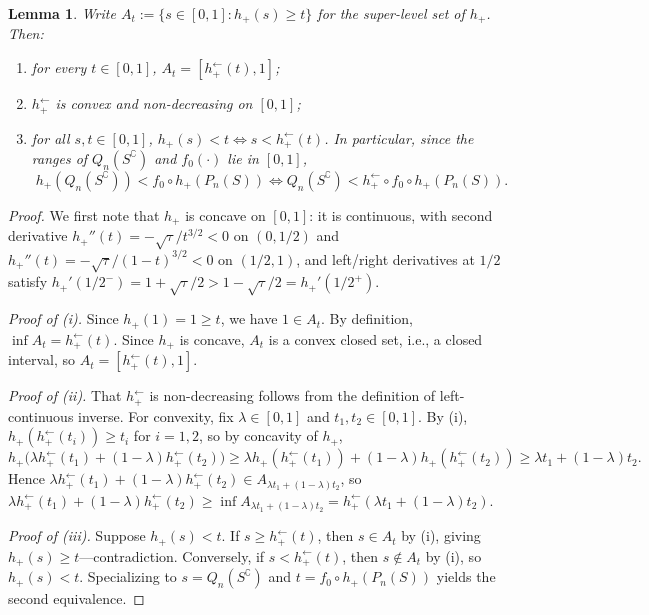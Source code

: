 \documentclass[english]{article}
\theoremstyle{plain}
\newtheorem{lemma}{Lemma}[section]
\theoremstyle{definition}
\newcommand{\hinv}{h_+^{\leftarrow}}
\newcommand{\fnull}{f_0}
\begin{document}
\begin{lemma}\label{lem:hinv-properties}
Write $A_t:=\{s\in[0,1]:h_+(s)\geqslant t\}$ for the super-level set of $h_+$. Then:
\begin{enumerate}[label=(\roman*)]
    \item for every $t\in[0,1]$, $A_t=[\hinv(t),1]$;
    \item $\hinv$ is convex and non-decreasing on $[0,1]$;
    \item for all $s,t\in[0,1]$, $h_+(s)<t\iff s<\hinv(t)$. In particular, since the ranges of $Q_n(S^\complement)$ and $\fnull(\cdot)$ lie in $[0,1]$,
    \[
        h_+(Q_n(S^\complement))<\fnull\circ h_+(P_n(S))\iff Q_n(S^\complement)<\hinv\circ\fnull\circ h_+(P_n(S)).
    \]
\end{enumerate}
\end{lemma}

\begin{proof}
We first note that $h_+$ is concave on $[0,1]$: it is continuous, with second derivative $h_+''(t)=-\sqrt{\tau}/t^{3/2}<0$ on $(0,1/2)$ and $h_+''(t)=-\sqrt{\tau}/(1-t)^{3/2}<0$ on $(1/2,1)$, and left/right derivatives at $1/2$ satisfy $h_+'(1/2^-)=1+\sqrt{\tau}/2>1-\sqrt{\tau}/2=h_+'(1/2^+)$.

\emph{Proof of (i).} Since $h_+(1)=1\geqslant t$, we have $1\in A_t$. By definition, $\inf A_t=\hinv(t)$. Since $h_+$ is concave, $A_t$ is a convex closed set, i.e., a closed interval, so $A_t=[\hinv(t),1]$.

\emph{Proof of (ii).} That $\hinv$ is non-decreasing follows from the definition of left-continuous inverse. For convexity, fix $\lambda\in[0,1]$ and $t_1,t_2\in[0,1]$. By (i), $h_+(\hinv(t_i))\geqslant t_i$ for $i=1,2$, so by concavity of $h_+$,
\[
    h_+\bigl(\lambda\hinv(t_1)+(1-\lambda)\hinv(t_2)\bigr)
    \geqslant \lambda h_+(\hinv(t_1))+(1-\lambda)h_+(\hinv(t_2))
    \geqslant \lambda t_1+(1-\lambda)t_2.
\]
Hence $\lambda\hinv(t_1)+(1-\lambda)\hinv(t_2)\in A_{\lambda t_1+(1-\lambda)t_2}$, so $\lambda\hinv(t_1)+(1-\lambda)\hinv(t_2)\geqslant \inf A_{\lambda t_1+(1-\lambda)t_2}=\hinv(\lambda t_1+(1-\lambda)t_2)$.

\emph{Proof of (iii).} Suppose $h_+(s)<t$. If $s\geqslant\hinv(t)$, then $s\in A_t$ by (i), giving $h_+(s)\geqslant t$---contradiction. Conversely, if $s<\hinv(t)$, then $s\notin A_t$ by (i), so $h_+(s)<t$. Specializing to $s=Q_n(S^\complement)$ and $t=\fnull\circ h_+(P_n(S))$ yields the second equivalence.
\end{proof}
\end{document}
